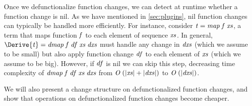 Once we defunctionalize function changes, we can detect at runtime whether a
function change is nil. As we have mentioned in \cref{sec:plugins}, nil function
changes can typically be handled more efficiently. For instance, consider \ensuremath{\Varid{t}\mathrel{=}\Varid{map}\;\Varid{f}\;\Varid{xs}}, a term that maps function \ensuremath{\Varid{f}} to each element of sequence \ensuremath{\Varid{xs}}. In
general, \ensuremath{\Derive{\Varid{t}}\mathrel{=}\Varid{dmap}\;\Varid{f}\;\Varid{df}\;\Varid{xs}\;\Varid{dxs}} must handle any change in \ensuremath{\Varid{dxs}} (which
we assume to be small) but also apply function change \ensuremath{\Varid{df}} to each element of
\ensuremath{\Varid{xs}} (which we assume to be big). However, if \ensuremath{\Varid{df}} is nil we can skip this step,
decreasing time complexity of \ensuremath{\Varid{dmap}\;\Varid{f}\;\Varid{df}\;\Varid{xs}\;\Varid{dxs}} from \ensuremath{\Conid{O}\;(\left|{\Varid{xs}}\right|\mathbin{+}\left|{\Varid{dxs}}\right|)}
to \ensuremath{\Conid{O}\;(\left|{\Varid{dxs}}\right|)}.

We will also present a change structure on defunctionalized function changes,
and show that operations on defunctionalized function changes become cheaper.






